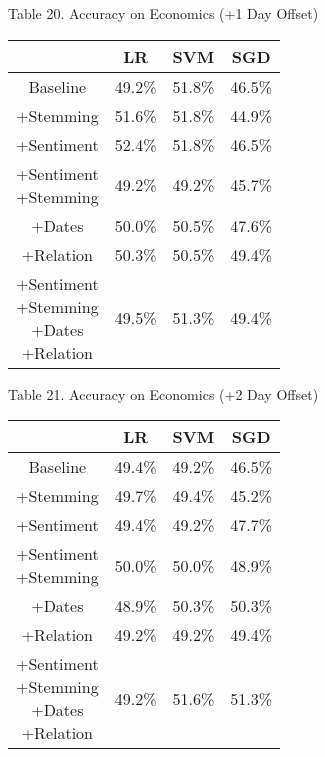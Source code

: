 \documentclass[11pt,a4paper]{article}
\begin{document}
\begin{center}
Table 20. Accuracy on Economics (+1 Day Offset)\\
\begin{tabular}{ |c|c|c|c| }
 \hline
  & LR & SVM & SGD \\
  \hline
  Baseline & 49.2\% & 51.8\% & 46.5\% \\
  \hline
 +Stemming & 51.6\% & 51.8\% & 44.9\% \\
  \hline
 +Sentiment & 52.4\% & 51.8\% & 46.5\% \\
  \hline
  \shortstack{+Sentiment \\ +Stemming} & 49.2\% & 49.2\% & 45.7\%\\
 \hline
 +Dates & 50.0\% & 50.5\% & 47.6\% \\
  \hline
 +Relation & 50.3\% & 50.5\% & 49.4\% \\
  \hline
  \shortstack{+Sentiment \\ +Stemming \\+Dates \\+Relation} & 49.5\% & 51.3\% & 49.4\% \\
 \hline
\end{tabular}
\end{center}

\begin{center}
Table 21. Accuracy on Economics (+2 Day Offset)\\
\begin{tabular}{ |c|c|c|c| }
 \hline
  & LR & SVM & SGD \\
  \hline
  Baseline & 49.4\% & 49.2\% & 46.5\% \\
  \hline
 +Stemming & 49.7\% & 49.4\% & 45.2\% \\
  \hline
 +Sentiment & 49.4\% & 49.2\% & 47.7\% \\
  \hline
  \shortstack{+Sentiment \\ +Stemming} & 50.0\% & 50.0\% & 48.9\%\\
 \hline
 +Dates & 48.9\% & 50.3\% & 50.3\% \\
  \hline
 +Relation & 49.2\% & 49.2\% & 49.4\% \\
  \hline
  \shortstack{+Sentiment \\ +Stemming \\+Dates \\+Relation} & 49.2\% & 51.6\% & 51.3\% \\
 \hline
\end{tabular}
\end{center}
\end{document}
